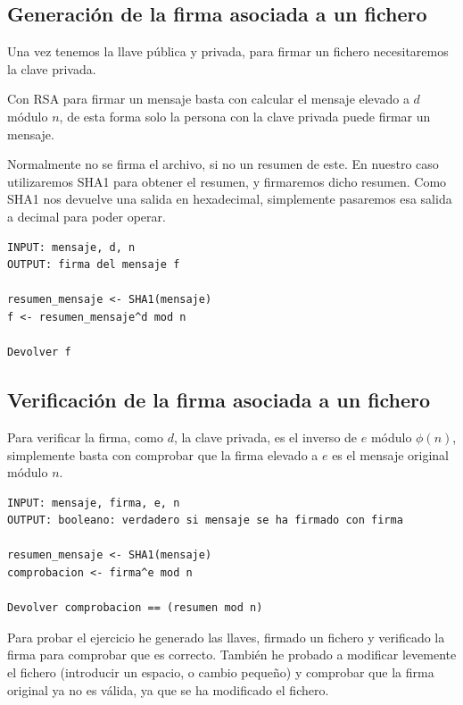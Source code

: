 \documentclass[12pt, spanish]{article}
\begin{document}
\subsection{Generación de la firma asociada a un fichero}

Una vez tenemos la llave pública y privada, para firmar un fichero necesitaremos la clave privada.

Con RSA para firmar un mensaje basta con calcular el mensaje elevado a $d$ módulo $n$, de esta forma solo la persona con la clave privada puede firmar un mensaje.

Normalmente no se firma el archivo, si no un resumen de este. En nuestro caso utilizaremos SHA1 para obtener el resumen, y firmaremos dicho resumen. Como SHA1 nos devuelve una salida en hexadecimal, simplemente pasaremos esa salida a decimal para poder operar.

\begin{lstlisting}[caption={Firmar mensaje RSA}]
INPUT: mensaje, d, n
OUTPUT: firma del mensaje f

resumen_mensaje <- SHA1(mensaje)
f <- resumen_mensaje^d mod n

Devolver f
\end{lstlisting}


\subsection{Verificación de la firma asociada a un fichero}

Para verificar la firma, como $d$, la clave privada, es el inverso de $e$ módulo $\phi(n)$, simplemente basta con comprobar que la firma elevado a $e$ es el mensaje original módulo $n$.

\begin{lstlisting}[caption={Verificar mensaje RSA}]
INPUT: mensaje, firma, e, n
OUTPUT: booleano: verdadero si mensaje se ha firmado con firma

resumen_mensaje <- SHA1(mensaje)
comprobacion <- firma^e mod n

Devolver comprobacion == (resumen mod n)
\end{lstlisting}


Para probar el ejercicio he generado las llaves, firmado un fichero y verificado la firma para comprobar que es correcto. También he probado a modificar levemente el fichero (introducir un espacio, o cambio pequeño) y comprobar que la firma original ya no es válida, ya que se ha modificado el fichero.
\end{document}

